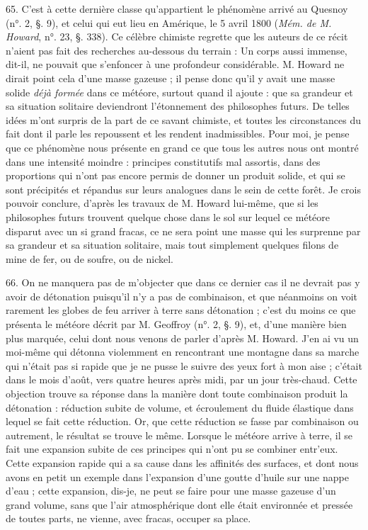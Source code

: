 \documentclass[a4paper, 11pt, oneside, polutonikogreek, french]{article}
\begin{document}
65. C'est à cette dernière classe qu'appartient le phénomène arrivé au Quesnoy (n°. 2, §. 9), et celui qui eut lieu en Amérique, le 5 avril 1800 (\emph{Mém. de M. Howard}, n°. 23, §. 338). Ce célèbre chimiste regrette que les auteurs de ce récit n'aient pas fait des recherches au-dessous du terrain : \og Un corps aussi immense, dit-il, ne pouvait que s'enfoncer à une profondeur considérable. \fg M. Howard ne dirait point cela d'une masse gazeuse ; il pense donc qu'il y avait une masse solide \emph{déjà formée} dans ce météore, surtout quand il ajoute : \og que sa grandeur et sa situation solitaire deviendront l'étonnement des philosophes futurs. \fg De telles idées m'ont surpris de la part de ce savant chimiste, et toutes les circonstances du fait dont il parle les repoussent et les rendent inadmissibles. Pour moi, je pense que ce phénomène nous présente en grand ce que tous les autres nous ont montré dans une intensité moindre : principes constitutifs mal assortis, dans des proportions qui n'ont pas encore permis de donner un produit solide, et qui se sont précipités et répandus sur leurs analogues dans le sein de cette forêt. Je crois pouvoir conclure, d'après les travaux de M. Howard lui-même, que si les philosophes futurs trouvent quelque chose dans le sol sur lequel ce météore disparut avec un si grand fracas, ce ne sera point une masse qui les surprenne par sa grandeur et sa situation solitaire, mais tout simplement quelques filons de mine de fer, ou de soufre, ou de nickel.

66. On ne manquera pas de m'objecter que dans ce dernier cas il ne devrait pas y avoir de détonation puisqu'il n'y a pas de combinaison, et que néanmoins on voit rarement les globes de feu arriver à terre sans détonation ; c'est du moins ce que présenta le météore décrit par M. Geoffroy (n°. 2, §. 9), et, d'une manière bien plus marquée, celui dont nous venons de parler d'après M. Howard. J'en ai vu un moi-même qui détonna violemment en rencontrant une montagne dans sa marche qui n'était pas si rapide que je ne pusse le suivre des yeux fort à mon aise ; c'était dans le mois d'août, vers quatre heures après midi, par un jour très-chaud. Cette objection trouve sa réponse dans la manière dont toute combinaison produit la détonation : \og réduction subite de volume, et écroulement du fluide élastique dans lequel se fait cette réduction. \fg Or, que cette réduction se fasse par combinaison ou autrement, le résultat se trouve le même. Lorsque le météore arrive à terre, il se fait une expansion subite de ces principes qui n'ont pu se combiner entr'eux. Cette expansion rapide qui a sa cause dans les affinités des surfaces, et dont nous avons en petit un exemple dans l'expansion d'une goutte d'huile sur une nappe d'eau ; cette expansion, dis-je, ne peut se faire pour une masse gazeuse d'un grand volume, sans que l'air atmosphérique dont elle était environnée et pressée de toutes parts, ne vienne, avec fracas, occuper sa place.
\end{document}
